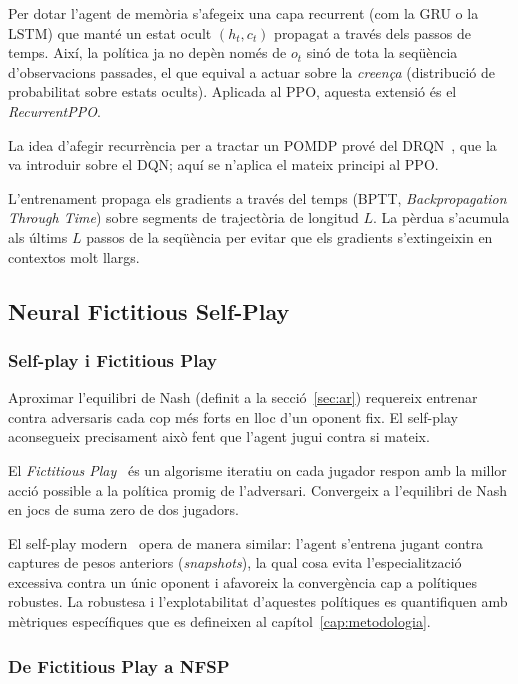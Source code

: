 Per dotar l'agent de memòria s'afegeix una capa recurrent (com la \acf{GRU} o la
\acs{LSTM}) que manté un estat ocult $(h_t, c_t)$ propagat a través dels passos de temps.
Així, la política ja no depèn només de $o_t$ sinó de tota la seqüència d'observacions
passades, el que equival a actuar sobre la \emph{creença} (distribució de probabilitat
sobre estats ocults). Aplicada al \ac{PPO}, aquesta extensió és el \emph{RecurrentPPO}. 

La idea d'afegir recurrència per a tractar un \ac{POMDP}
prové del \acf{DRQN}~\cite{hausknecht2015drqn}, que la va introduir sobre el \ac{DQN}; aquí
se n'aplica el mateix principi al \ac{PPO}.

L'entrenament propaga els gradients a través del temps (BPTT,
\emph{Backpropagation Through Time}) sobre segments de trajectòria de longitud $L$. La
pèrdua s'acumula als últims $L$ passos de la seqüència per evitar que els gradients
s'extingeixin en contextos molt llargs.

\subsection{Neural Fictitious Self-Play}
\label{sec:nfsp}

\subsubsection*{Self-play i Fictitious Play}

Aproximar l'equilibri de Nash (definit a la secció~\ref{sec:ar}) requereix
entrenar contra adversaris cada cop més forts en lloc d'un oponent fix. El
self-play aconsegueix precisament això fent que l'agent jugui contra si mateix.

El \emph{Fictitious Play}~\cite{brown1951fictitious} és un algorisme iteratiu on cada
jugador respon amb la millor acció possible a la política promig de l'adversari.
Convergeix a l'equilibri de Nash en jocs de suma zero de dos jugadors.

El self-play modern~\cite{brown2019pluribus} opera de manera similar: l'agent
s'entrena jugant contra captures de pesos anteriors (\emph{snapshots}), la
qual cosa evita l'especialització excessiva contra un únic oponent i afavoreix
la convergència cap a polítiques robustes. La robustesa i l'explotabilitat
d'aquestes polítiques es quantifiquen amb mètriques específiques que es defineixen
al capítol~\ref{cap:metodologia}.

\subsubsection*{De Fictitious Play a NFSP}

